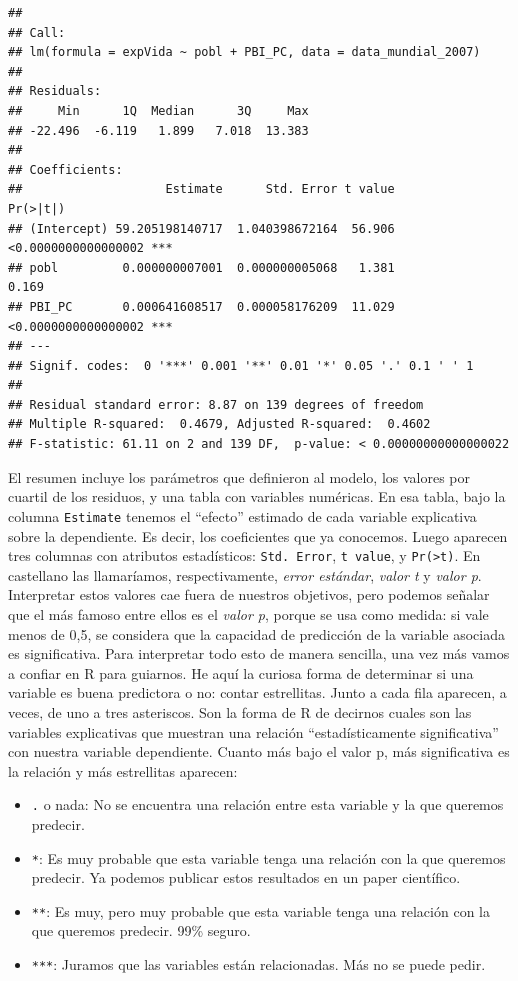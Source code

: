 \documentclass[spanish,]{book}
\providecommand{\tightlist}{%
  \setlength{\itemsep}{0pt}\setlength{\parskip}{0pt}}
\begin{document}
\begin{verbatim}
## 
## Call:
## lm(formula = expVida ~ pobl + PBI_PC, data = data_mundial_2007)
## 
## Residuals:
##     Min      1Q  Median      3Q     Max 
## -22.496  -6.119   1.899   7.018  13.383 
## 
## Coefficients:
##                    Estimate      Std. Error t value            Pr(>|t|)    
## (Intercept) 59.205198140717  1.040398672164  56.906 <0.0000000000000002 ***
## pobl         0.000000007001  0.000000005068   1.381               0.169    
## PBI_PC       0.000641608517  0.000058176209  11.029 <0.0000000000000002 ***
## ---
## Signif. codes:  0 '***' 0.001 '**' 0.01 '*' 0.05 '.' 0.1 ' ' 1
## 
## Residual standard error: 8.87 on 139 degrees of freedom
## Multiple R-squared:  0.4679, Adjusted R-squared:  0.4602 
## F-statistic: 61.11 on 2 and 139 DF,  p-value: < 0.00000000000000022
\end{verbatim}

El resumen incluye los parámetros que definieron al modelo, los valores por cuartil de los residuos, y una tabla con variables numéricas. En esa tabla, bajo la columna \texttt{Estimate} tenemos el ``efecto'' estimado de cada variable explicativa sobre la dependiente. Es decir, los coeficientes que ya conocemos. Luego aparecen tres columnas con atributos estadísticos: \texttt{Std.\ Error}, \texttt{t\ value}, y \texttt{Pr(\textgreater{}\textbar{}t\textbar{})}. En castellano las llamaríamos, respectivamente, \emph{error estándar}, \emph{valor t} y \emph{valor p}. Interpretar estos valores cae fuera de nuestros objetivos, pero podemos señalar que el más famoso entre ellos es el \emph{valor p}, porque se usa como medida: si vale menos de 0,5, se considera que la capacidad de predicción de la variable asociada es significativa. Para interpretar todo esto de manera sencilla, una vez más vamos a confiar en R para guiarnos. He aquí la curiosa forma de determinar si una variable es buena predictora o no: contar estrellitas. Junto a cada fila aparecen, a veces, de uno a tres asteriscos. Son la forma de R de decirnos cuales son las variables explicativas que muestran una relación ``estadísticamente significativa'' con nuestra variable dependiente. Cuanto más bajo el valor p, más significativa es la relación y más estrellitas aparecen:

\begin{itemize}
\tightlist
\item
  \texttt{.} o nada: No se encuentra una relación entre esta variable y la que queremos predecir.
\item
  \texttt{*}: Es muy probable que esta variable tenga una relación con la que queremos predecir. Ya podemos publicar estos resultados en un paper científico.
\item
  \texttt{**}: Es muy, pero muy probable que esta variable tenga una relación con la que queremos predecir. 99\% seguro.
\item
  \texttt{***}: Juramos que las variables están relacionadas. Más no se puede pedir.
\end{itemize}
\end{document}
